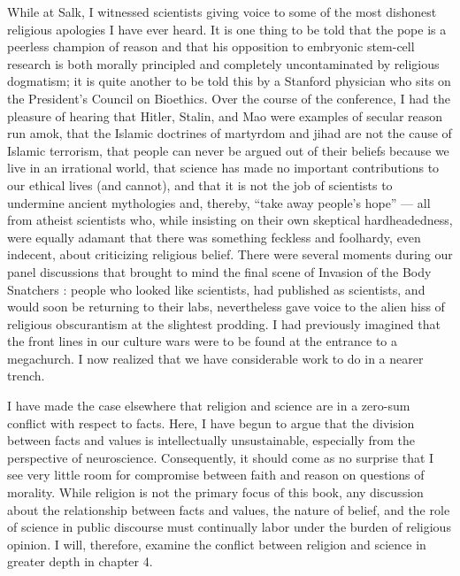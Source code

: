 \documentclass[a4paper,14pt]{extbook}
\begin{document}
While at Salk, I witnessed scientists giving voice to some of the most dishonest religious apologies I have ever heard.
It is one thing to be told that the pope is a peerless champion of reason and that his opposition to embryonic stem-cell research is both morally principled and completely uncontaminated by religious dogmatism;
it is quite another to be told this by a Stanford physician who sits on the President's Council on Bioethics.
Over the course of the conference, I had the pleasure of hearing that Hitler, Stalin, and Mao were examples of secular reason run amok, that the Islamic doctrines of martyrdom and jihad are not the cause of Islamic terrorism, that people can never be argued out of their beliefs because we live in an irrational world, that science has made no important contributions to our ethical lives (and cannot), and that it is not the job of scientists to undermine ancient mythologies and, thereby, “take away people's hope” --- all from atheist scientists who, while insisting on their own skeptical hardheadedness, were equally adamant that there was something feckless and foolhardy, even indecent, about criticizing religious belief.
There were several moments during our panel discussions that brought to mind the final scene of Invasion of the Body Snatchers :
people who looked like scientists, had published as scientists, and would soon be returning to their labs, nevertheless gave voice to the alien hiss of religious obscurantism at the slightest prodding.
I had previously imagined that the front lines in our culture wars were to be found at the entrance to a megachurch.
I now realized that we have considerable work to do in a nearer trench.

I have made the case elsewhere that religion and science are in a zero-sum conflict with respect to facts.
Here, I have begun to argue that the division between facts and values is intellectually unsustainable, especially from the perspective of neuroscience.
Consequently, it should come as no surprise that I see very little room for compromise between faith and reason on questions of morality.
While religion is not the primary focus of this book, any discussion about the relationship between facts and values, the nature of belief, and the role of science in public discourse must continually labor under the burden of religious opinion.
I will, therefore, examine the conflict between religion and science in greater depth in chapter 4.
\end{document}
